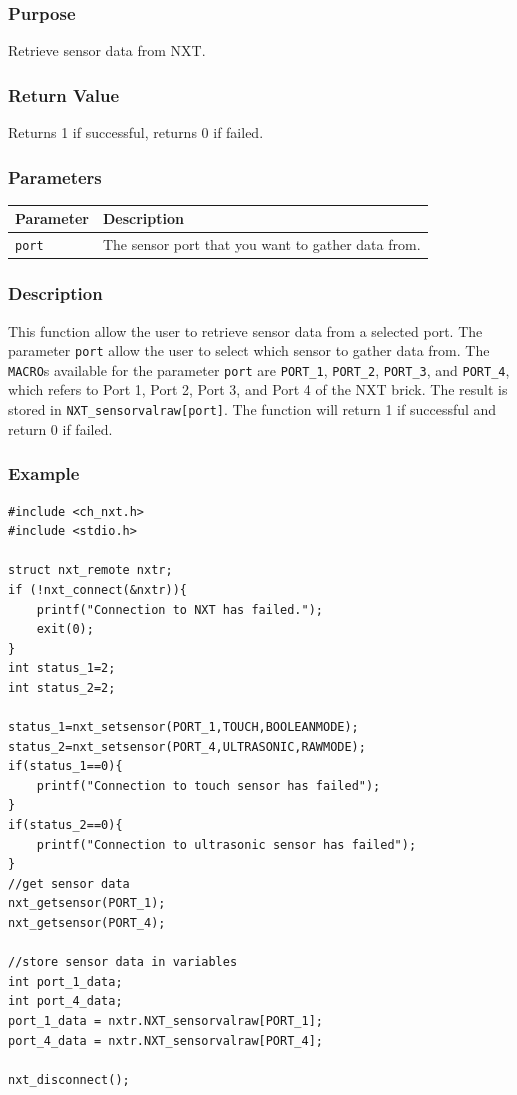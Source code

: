 \documentclass[12pt]{article}
\begin{document}
\subsubsection*{Purpose}
Retrieve sensor data from NXT.

\subsubsection*{Return Value}
Returns 1 if successful, returns 0 if failed.

\subsubsection*{Parameters}
\begin{tabular}{ l | p{12cm} }
Parameter			& Description\\ \hline
\verb+port+			& The sensor port that you want to gather data from. 
\end{tabular}

\subsubsection*{Description}
This function allow the user to retrieve sensor data from a selected port. The parameter \verb+port+ allow the user to select which sensor to gather data from. The \verb+MACRO+s available for the parameter \verb+port+ are \verb+PORT_1+, \verb+PORT_2+, \verb+PORT_3+, and \verb+PORT_4+, which refers to Port 1, Port 2, Port 3, and Port 4 of the NXT brick. The result is stored in \verb+NXT_sensorvalraw[port]+.
The function will return 1 if successful and return 0 if failed.

\subsubsection*{Example}
\begin{verbatim}
#include <ch_nxt.h> 
#include <stdio.h>

struct nxt_remote nxtr;
if (!nxt_connect(&nxtr)){
    printf("Connection to NXT has failed.");
    exit(0);
}
int status_1=2;
int status_2=2;
    
status_1=nxt_setsensor(PORT_1,TOUCH,BOOLEANMODE);
status_2=nxt_setsensor(PORT_4,ULTRASONIC,RAWMODE);
if(status_1==0){
    printf("Connection to touch sensor has failed");
}
if(status_2==0){
    printf("Connection to ultrasonic sensor has failed");
}
//get sensor data
nxt_getsensor(PORT_1);
nxt_getsensor(PORT_4);
    
//store sensor data in variables
int port_1_data;
int port_4_data;
port_1_data = nxtr.NXT_sensorvalraw[PORT_1];
port_4_data = nxtr.NXT_sensorvalraw[PORT_4];
    
nxt_disconnect();
\end{verbatim}
\end{document}
